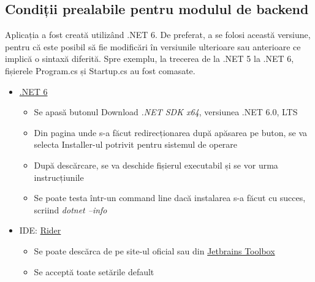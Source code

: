 \subsection{Condiții prealabile pentru modulul de backend}
Aplicația a fost creată utilizând .NET 6. De preferat, a se folosi această versiune, pentru că este posibil să fie modificări în versiunile ulterioare sau anterioare ce implică o sintaxă diferită.
Spre exemplu, la trecerea de la .NET 5 la .NET 6, fișierele Program.cs și Startup.cs au fost comasate.
\begin{itemize}
    \setlength\itemsep{0.5em}
    \item \href{https://dotnet.microsoft.com/en-us/download}{\color{blue}.NET 6}
    \begin{itemize}
        \setlength\itemsep{0.5em}
        \item Se apasă butonul Download {\it .NET SDK x64}, versiunea .NET 6.0, LTS
        \item Din pagina unde s-a făcut redirecționarea după apăsarea pe buton, se va selecta Installer-ul potrivit pentru sistemul de operare
        \item După descărcare, se va deschide fișierul executabil și se vor urma instrucțiunile
        \item Se poate testa într-un command line dacă instalarea s-a făcut cu succes, scriind {\it dotnet --info}
    \end{itemize}
    \item IDE: \href{https://www.jetbrains.com/rider/download/#section=windows}{\color{blue}Rider}
    \begin{itemize}
        \setlength\itemsep{0.5em}
        \item Se poate descărca de pe site-ul oficial sau din \href{https://www.jetbrains.com/toolbox-app/}{\color{blue}Jetbrains Toolbox}
        \item Se acceptă toate setările default
    \end{itemize}
\end{itemize}

